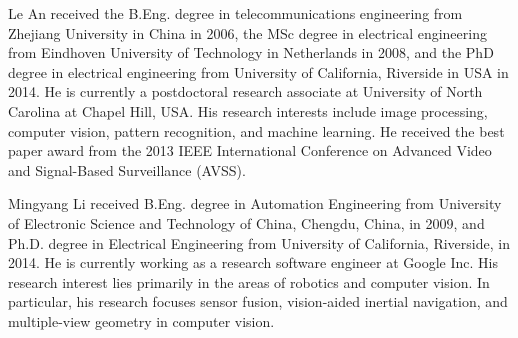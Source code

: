 \documentclass[10pt,journal]{IEEEtran}
\begin{document}
\begin{IEEEbiography}{Le An} received the B.Eng. degree in telecommunications engineering from Zhejiang University in China in 2006, the MSc degree in electrical engineering from Eindhoven University of Technology in Netherlands in 2008, and the PhD degree in electrical engineering from University of California, Riverside in USA in 2014. He is currently a postdoctoral research associate at University of North Carolina at Chapel Hill, USA.  
His research interests include image processing, computer vision, pattern recognition, and machine learning. He received the best paper award from the 2013 IEEE International Conference on Advanced Video and Signal-Based Surveillance (AVSS).
\end{IEEEbiography}

\begin{IEEEbiography}{Mingyang Li} received B.Eng. degree in Automation Engineering from University of Electronic Science and Technology of China, Chengdu, China, in 2009, and Ph.D. degree in
Electrical Engineering from University of California, Riverside, in 2014. He is currently working as a research software engineer at Google Inc. His research interest lies primarily in the areas of robotics and computer vision. In particular, his research focuses sensor fusion, vision-aided inertial navigation, and multiple-view geometry in computer vision. 

\end{IEEEbiography}
\end{document}
